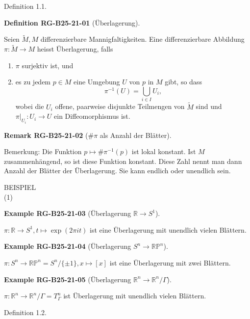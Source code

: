 \documentclass[10pt, letterpaper]{article}
\newcommand{\CustomHeading}[3]{%
  \par\medskip\noindent%
  \textbf{#1 #2} \textnormal{(#3)}.\enskip%
}
\newenvironment{DEF}[2]{\begin{unitbox}\CustomHeading{Definition}{#1}{#2}}{\end{unitbox}}
\newenvironment{REM}[2]{\begin{unitbox}\CustomHeading{Remark}{#1}{#2}}{\end{unitbox}}
\newenvironment{EXA}[2]{\begin{unitbox}\CustomHeading{Example}{#1}{#2}}{\end{unitbox}}
\begin{document}
Definition 1.1. 

\begin{DEF}{RG-B25-21-01}{Überlagerung}
Seien $\tilde{M}, M$ differenzierbare Mannigfaltigkeiten. Eine differenzierbare Abbildung $\pi: \tilde{M} \rightarrow M$ heisst Überlagerung, falls
\begin{enumerate}
  \item $\pi$ surjektiv ist, und
  \item es zu jedem $p \in M$ eine Umgebung $U$ von $p$ in $M$ gibt, so dass
  \[
  \pi^{-1}(U) = \bigcup_{i \in I} U_i,
  \]
  wobei die $U_i$ offene, paarweise disjunkte Teilmengen von $\tilde{M}$ sind und $\left.\pi\right|_{U_i} : U_i \to U$ ein Diffeomorphismus ist.
\end{enumerate}
\end{DEF}


\begin{REM}{RG-B25-21-02}{$\#\pi$ als Anzahl der Blätter}
Bemerkung: Die Funktion $p \mapsto \# \pi^{-1}(p)$ ist lokal konstant. Ist $M$ zusammenhängend, so ist diese Funktion konstant. Diese Zahl nennt man dann Anzahl der Blätter der Überlagerung. Sie kann endlich oder unendlich sein.
\end{REM}

BEISPIEL\\


(1) 

\begin{EXA}{RG-B25-21-03}{Überlagerung $\mathbb{R} \rightarrow S^{1}$}
$\pi: \mathbb{R} \rightarrow S^{1}, t \mapsto \exp (2 \pi i t)$ ist eine Überlagerung mit unendlich vielen Blättern.
\end{EXA}


\begin{EXA}{RG-B25-21-04}{Überlagerung $S^{n} \rightarrow \mathbb{R} \mathbb{P}^{n}$}
$\pi: S^{n} \rightarrow \mathbb{R} \mathbb{P}^{n}=S^{n} /\{ \pm 1\}, x \mapsto[x]$ ist eine Überlagerung mit zwei Blättern.
\end{EXA}


\begin{EXA}{RG-B25-21-05}{Überlagerung $\mathbb{R}^{n} \rightarrow \mathbb{R}^{n} / \Gamma$}
$\pi: \mathbb{R}^{n} \rightarrow \mathbb{R}^{n} / \Gamma=T_{\Gamma}^{n}$ ist Überlagerung mit unendlich vielen Blättern.
\end{EXA}




Definition 1.2. 
\end{document}
